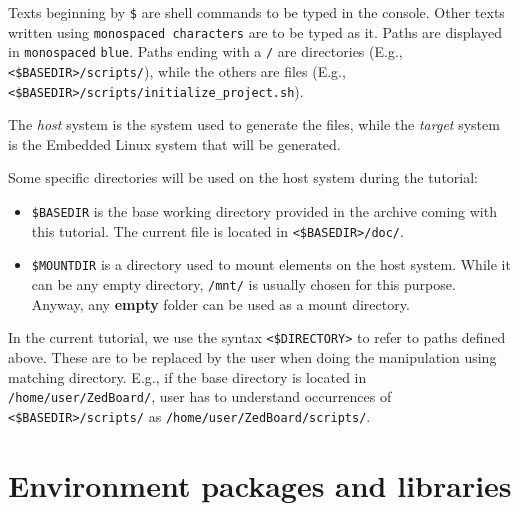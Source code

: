\documentclass[openany,a4paper]{book}
\begin{document}
Texts beginning by \texttt{\$} are shell commands to be typed in the console.
Other texts written using \texttt{monospaced characters} are to be typed as it.
Paths are displayed in \nolinkurl{monospaced} \nolinkurl{blue}.
Paths ending with a \nolinkurl{/} are directories (E.g., \nolinkurl{<$BASEDIR>/scripts/}), while the others are files (E.g., \nolinkurl{<$BASEDIR>/scripts/initialize_project.sh}).

The \textit{host} system is the system used to generate the files, while the \textit{target} system is the Embedded Linux system that will be generated.

Some specific directories will be used on the host system during the tutorial:
\begin{itemize} 
\item \nolinkurl{$BASEDIR} is the base working directory provided in the archive coming with this tutorial. The current file is located in \nolinkurl{<$BASEDIR>/doc/}.
\item \nolinkurl{$MOUNTDIR} is a directory used to mount elements on the host system. While it can be any empty directory, \nolinkurl{/mnt/} is usually chosen for this purpose. Anyway, any \textbf{empty} folder can be used as a mount directory.
\end{itemize}


In the current tutorial, we use the syntax \nolinkurl{<$DIRECTORY>} to refer to paths defined above.
These are to be replaced by the user when doing the manipulation using matching directory.
E.g., if the base directory is located in \nolinkurl{/home/user/ZedBoard/}, user has to understand occurrences of \nolinkurl{<$BASEDIR>/scripts/} as \nolinkurl{/home/user/ZedBoard/scripts/}.


\section{Environment packages and libraries}
\end{document}
